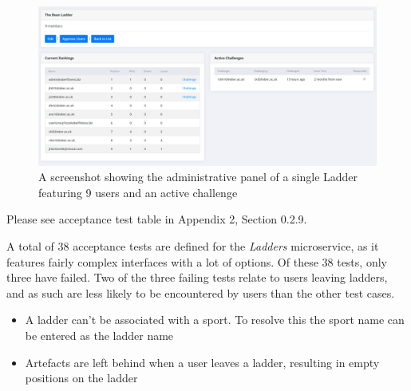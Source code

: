 \begin{figure}[H]
    \centering
    \includegraphics[width=\textwidth]{Images/service_ladders.png}
    \caption{A screenshot showing the administrative panel of a single Ladder featuring 9 users and an active challenge}
\end{figure}

Please see acceptance test table in Appendix 2, Section 0.2.9.

A total of 38 acceptance tests are defined for the \textit{Ladders} microservice, as it features fairly complex interfaces with a lot of options. Of these 38 tests, only three have failed. Two of the three failing tests relate to users leaving ladders, and as such are less likely to be encountered by users than the other test cases.


\begin{itemize}
	\item A ladder can't be associated with a sport. To resolve this the sport name can be entered as the ladder name

	\item Artefacts are left behind when a user leaves a ladder, resulting in empty positions on the ladder
\end{itemize}